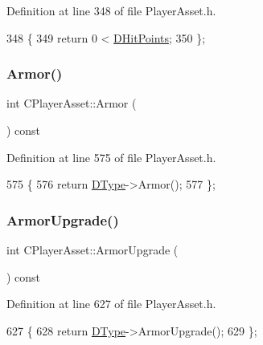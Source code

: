 Definition at line 348 of file Player\+Asset.\+h.


\begin{DoxyCode}
348                           \{
349             \textcolor{keywordflow}{return} 0 < \hyperlink{classCPlayerAsset_a331750935bf594e665544085fb74e89d}{DHitPoints};
350         \};
\end{DoxyCode}
\hypertarget{classCPlayerAsset_a3de4826a7d7e8d2c5fd325ec736567ab}{}\label{classCPlayerAsset_a3de4826a7d7e8d2c5fd325ec736567ab} 
\subsubsection{\texorpdfstring{Armor()}{Armor()}}
{\footnotesize\ttfamily int C\+Player\+Asset\+::\+Armor (\begin{DoxyParamCaption}{ }\end{DoxyParamCaption}) const\hspace{0.3cm}{\ttfamily [inline]}}



Definition at line 575 of file Player\+Asset.\+h.


\begin{DoxyCode}
575                          \{
576             \textcolor{keywordflow}{return} \hyperlink{classCPlayerAsset_a5d61f73471e1e6f0a6ab15f2ffa7b359}{DType}->Armor();
577         \};
\end{DoxyCode}
\hypertarget{classCPlayerAsset_a1312cb77efe2cf732cc255a8345e7c44}{}\label{classCPlayerAsset_a1312cb77efe2cf732cc255a8345e7c44} 
\subsubsection{\texorpdfstring{Armor\+Upgrade()}{ArmorUpgrade()}}
{\footnotesize\ttfamily int C\+Player\+Asset\+::\+Armor\+Upgrade (\begin{DoxyParamCaption}{ }\end{DoxyParamCaption}) const\hspace{0.3cm}{\ttfamily [inline]}}



Definition at line 627 of file Player\+Asset.\+h.


\begin{DoxyCode}
627                                 \{
628             \textcolor{keywordflow}{return} \hyperlink{classCPlayerAsset_a5d61f73471e1e6f0a6ab15f2ffa7b359}{DType}->ArmorUpgrade();
629         \};
\end{DoxyCode}
\hypertarget{classCPlayerAsset_acbc2e90c81b34861edd613e4bf8325f8}{}\label{classCPlayerAsset_acbc2e90c81b34861edd613e4bf8325f8} 

